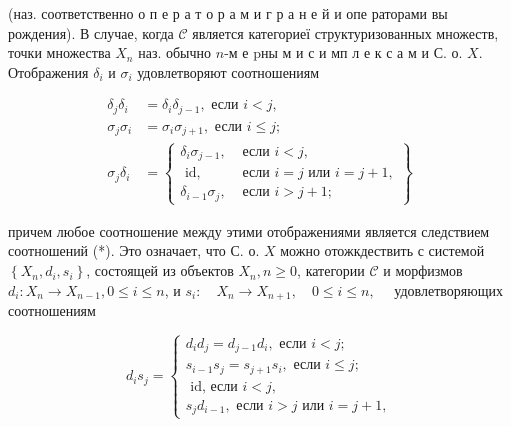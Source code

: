 \documentclass[10pt]{article}
\begin{document}
(наз. соответственно о п е р а т о р а м и г р а н е й и опе раторами вы рождения). В случае, когда $\mathscr{C}$ является категориеї структуризованных множеств, точки множества $X_{n}$ наз. обычно $n$-м е pны м и с и мп л е к с а м и С. о. $X$. Отображения $\delta_{i}$ и $\sigma_{i}$ удовлетворяют соотношениям



\[

\begin{aligned}

\delta_{j} \delta_{i} & =\delta_{i} \delta_{j-1}, \text { если } i<j, \\

\sigma_{j} \sigma_{i} & =\sigma_{i} \sigma_{j+1}, \text { если } i \leqslant j ; \\

\sigma_{j} \delta_{i} & =\left\{\begin{array}{ll}

\delta_{i} \sigma_{j-1}, & \text { если } i<j, \\

\text { id, } & \text { если } i=j \text { или } i=j+1, \\

\delta_{i-1} \sigma_{j}, & \text { если } i>j+1 ;

\end{array}\right\}

\end{aligned}

\]



причем любое соотношение между этими отображениями является следствием соотношений (*). Это означает, что С. о. $X$ можно отожкдествить с системой $\left\{X_{n}, d_{i}, s_{i}\right\}$, состоящей из объектов $X_{n}, n \geqslant 0$, категории $\mathscr{C}$ и морфизмов $d_{i}: X_{n} \rightarrow X_{n-1}, 0 \leqslant i \leqslant n$, и $s_{i}: \quad X_{n} \rightarrow X_{n+1}, \quad 0 \leqslant i \leqslant n, \quad$ удовлетворяющих соотношениям



\[

d_{i} s_{j}=\left\{\begin{array}{c}

d_{i} d_{j}=d_{j-1} d_{i}, \text { если } i<j ; \\

s_{i-1} s_{j}=s_{j+1} s_{i}, \text { если } i \leqslant j ; \\

\text { id, если } i<j, \\

s_{j} d_{i-1}, \text { если } i>j \text { или } i=j+1,

\end{array}\right.

\]
\end{document}
